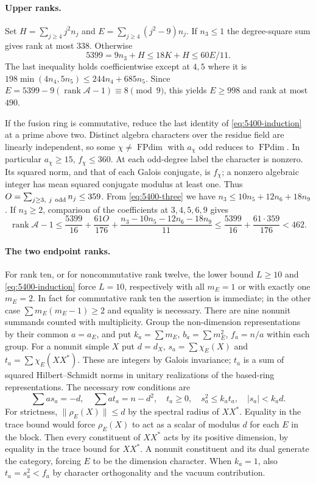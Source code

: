 \documentclass[11pt,a4paper]{article}
\numberwithin{equation}{section}
\theoremstyle{remark}
\newcommand{\FPdim}{\operatorname{FPdim}}
\newcommand{\rank}{\operatorname{rank}}
\begin{document}
\paragraph{Upper ranks.}
Set $H=\sum_{j\ge4}j^2n_j$ and $E=\sum_{j\ge4}(j^2-9)n_j$.
If $n_3\le1$ the degree-square sum gives rank at most $338$.
Otherwise
\[
 5399=9n_3+H\le18K+H\le60E/11 .
\]
The last inequality holds coefficientwise except at $4,5$ where it
is $198\min(4n_4,5n_5)\le244n_4+685n_5$.
Since $E=5399-9(\rank\mathcal A-1)\equiv8\pmod9$, this yields
$E\ge998$ and rank at most $490$.

If the fusion ring is commutative, reduce the last identity of
\eqref{eq:5400-induction} at a prime above two. Distinct algebra
characters over the residue field are linearly independent, so some
$\chi\ne\FPdim$ with $a_\chi$ odd reduces to $\FPdim$. In particular
$a_\chi\ge15$, $f_\chi\le360$. At each odd-degree label the character
is nonzero. Its squared norm, and that of each Galois conjugate, is
$f_\chi$; a nonzero algebraic integer has mean squared conjugate
modulus at least one. Thus $O=\sum_{j\ge3,\ j\ {\rm odd}}n_j\le359$.
From \eqref{eq:5400-three} we have
$n_3\le10n_5+12n_6+18n_9$. If $n_3\ge2$, comparison of the
coefficients at $3,4,5,6,9$ gives
\[
 \rank\mathcal A-1\le\frac{5399}{16}+\frac{61O}{176}
  +\frac{n_3-10n_5-12n_6-18n_9}{11}
 \le\frac{5399}{16}+\frac{61\cdot359}{176}<462 .
\]

\paragraph{The two endpoint ranks.}
For rank ten, or for noncommutative rank twelve, the lower bound
$L\ge10$ and \eqref{eq:5400-induction} force $L=10$, respectively
with all $m_E=1$ or with exactly one $m_E=2$. In fact for commutative
rank ten the assertion is immediate; in the other case
$\sum m_E(m_E-1)\ge2$ and equality is necessary.
There are nine nonunit summands counted with multiplicity. Group the
non-dimension representations by their common $a=a_E$, and put
$k_a=\sum m_E$, $b_a=\sum m_E^2$, $f_a=n/a$ within each group. For
a nonunit simple $X$ put $d=d_X$, $s_a=\sum\chi_E(X)$ and
$t_a=\sum\chi_E(XX^*)$. These are integers by Galois invariance;
$t_a$ is a sum of squared Hilbert--Schmidt norms in unitary
realizations of the based-ring representations. The necessary row
conditions are
\begin{equation}\label{eq:5400-charrows}
 \sum a s_a=-d,\quad \sum a t_a=n-d^2,\quad
 t_a\ge0,\quad s_a^2\le k_at_a,\quad |s_a|<k_ad .
\end{equation}
For strictness, $\|\rho_E(X)\|\le d$ by the spectral radius of
$XX^*$. Equality in the trace bound would force $\rho_E(X)$ to act
as a scalar of modulus $d$ for each $E$ in the block. Then every
constituent of $XX^*$ acts by its positive dimension, by equality
in the trace bound for $XX^*$. A nonunit constituent and its dual
generate the category, forcing $E$ to be the dimension character.
When $k_a=1$, also $t_a=s_a^2<f_a$ by character orthogonality
and the vacuum contribution.
\end{document}
